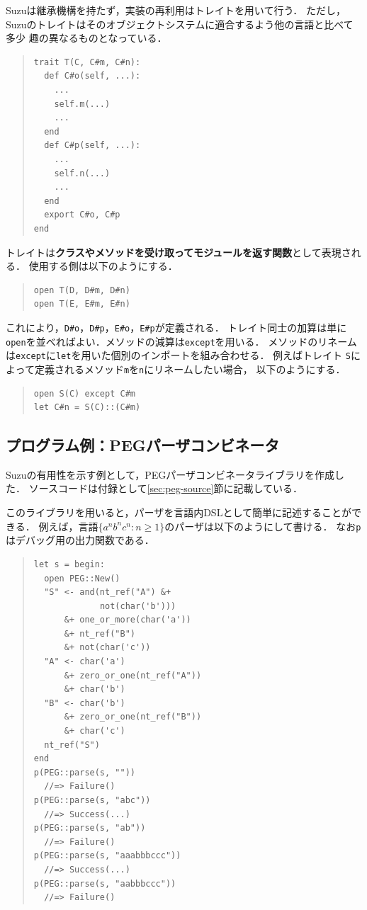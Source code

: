 \documentclass{ipsjprosym}
\begin{document}
Suzuは継承機構を持たず，実装の再利用はトレイト\cite{Scharli:2003}を用いて行う．
ただし，Suzuのトレイトはそのオブジェクトシステムに適合するよう他の言語と比べて多少
趣の異なるものとなっている．
\begin{quote}
\begin{verbatim}
trait T(C, C#m, C#n):
  def C#o(self, ...):
    ...
    self.m(...)
    ...
  end
  def C#p(self, ...):
    ...
    self.n(...)
    ...
  end
  export C#o, C#p
end
\end{verbatim}
\end{quote}
トレイトは\textbf{クラスやメソッドを受け取ってモジュールを返す関数}として表現される．
使用する側は以下のようにする．
\begin{quote}
\begin{verbatim}
open T(D, D#m, D#n)
open T(E, E#m, E#n)
\end{verbatim}
\end{quote}
これにより，\verb|D#o|，\verb|D#p|，\verb|E#o|，\verb|E#p|が定義される．
トレイト同士の加算は単に\verb|open|を並べればよい．メソッドの減算は\verb|except|を用いる．
メソッドのリネームは\verb|except|に\verb|let|を用いた個別のインポートを組み合わせる．
例えばトレイト \verb|S|によって定義されるメソッド\verb|m|を\verb|n|にリネームしたい場合，
以下のようにする．
\begin{quote}
\begin{verbatim}
open S(C) except C#m
let C#n = S(C)::(C#m)
\end{verbatim}
\end{quote}

\subsection{プログラム例：PEGパーザコンビネータ}

Suzuの有用性を示す例として，PEGパーザコンビネータライブラリを作成した．
ソースコードは付録として\ref{sec:peg-source}節に記載している．

このライブラリを用いると，パーザを言語内DSLとして簡単に記述することができる．
例えば，言語$\{a^n b^n c^n:n\ge1\}$のパーザは以下のようにして書ける．
なお\verb|p|はデバッグ用の出力関数である．

\begin{quote}
\begin{verbatim}
let s = begin:
  open PEG::New()
  "S" <- and(nt_ref("A") &+
             not(char('b')))
      &+ one_or_more(char('a'))
      &+ nt_ref("B")
      &+ not(char('c'))
  "A" <- char('a')
      &+ zero_or_one(nt_ref("A"))
      &+ char('b')
  "B" <- char('b')
      &+ zero_or_one(nt_ref("B"))
      &+ char('c')
  nt_ref("S")
end
p(PEG::parse(s, ""))
  //=> Failure()
p(PEG::parse(s, "abc"))
  //=> Success(...)
p(PEG::parse(s, "ab"))
  //=> Failure()
p(PEG::parse(s, "aaabbbccc"))
  //=> Success(...)
p(PEG::parse(s, "aabbbccc"))
  //=> Failure()
\end{verbatim}
\end{quote}
\end{document}
